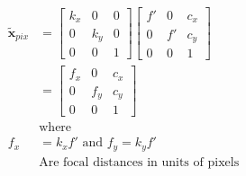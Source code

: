 \begin{equation}
    \begin{aligned}
        \tilde{\mathbf{x}}_{pix} &= \begin{bmatrix}
            k_x & 0& 0 \\ 0 & k_y & 0 \\ 0 & 0 & 1
        \end{bmatrix} \begin{bmatrix}
            f' & 0 & c_x \\ 0 & f' & c_y \\ 0 & 0 & 1 
        \end{bmatrix} \\
        & = \begin{bmatrix}
            f_x & 0 & c_x \\ 0 & f_y & c_y \\ 0 & 0 & 1 
        \end{bmatrix}\\
        &\text{where}\\
        f_x &= k_x f' \text{        and        } f_y = k_y f' \\
        &\text{Are focal distances in units of pixels} 
    \end{aligned}
    \label{eq:pixel-scaling}
\end{equation}